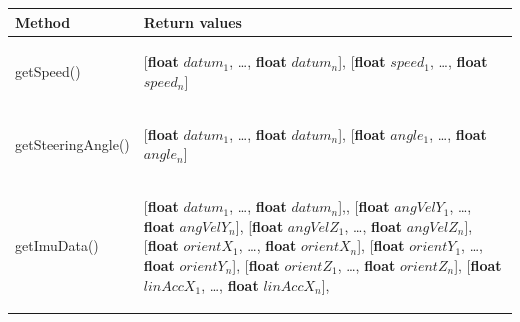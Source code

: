 \documentclass[]{scrreprt}
\begin{document}
	\begin{table}[H]
		\centering
		\begin{tabular}{|l|l|}
			\hline 
			Method & Return values \\ 
			\hline \hline
			\begin{pbox}{6.0cm}{\vspace{.2\baselineskip}
					getSpeed()
					\vspace{.3\baselineskip}} \end{pbox}&\begin{pbox}{6.0cm}{\vspace{.2\baselineskip}
					[\textbf{float} $datum_1$, \dots, \textbf{float} $datum_n$], [\textbf{float} $speed_1$, \dots, \textbf{float} $speed_n$]
					\vspace{.3\baselineskip}} \end{pbox}\\ 
			\hline 
			\begin{pbox}{6.0cm}{\vspace{.2\baselineskip}
					getSteeringAngle()
					\vspace{.3\baselineskip}} \end{pbox}&\begin{pbox}{6.0cm}{\vspace{.2\baselineskip}
					[\textbf{float} $datum_1$, \dots, \textbf{float} $datum_n$], [\textbf{float} $angle_1$, \dots, \textbf{float} $angle_n$]
						\vspace{.3\baselineskip}} \end{pbox}\\ 
			\hline 
			\begin{pbox}{6.0cm}{\vspace{.2\baselineskip}
					getImuData()
					\vspace{.3\baselineskip}}
			\end{pbox}&
			\begin{pbox}{6.7cm}{\vspace{.2\baselineskip}
					[\textbf{float} $datum_1$, \dots, \textbf{float} $datum_n$],\newline
					[\textbf{float} $angVelX_1$, \dots, \textbf{float} $angVelX_n$],
					[\textbf{float} $angVelY_1$, \dots, \textbf{float} $angVelY_n$],
					[\textbf{float} $angVelZ_1$, \dots, \textbf{float} $angVelZ_n$],
					[\textbf{float} $orientX_1$, \dots, \textbf{float} $orientX_n$],
					[\textbf{float} $orientY_1$, \dots, \textbf{float} $orientY_n$],
					[\textbf{float} $orientZ_1$, \dots, \textbf{float} $orientZ_n$],
					[\textbf{float} $linAccX_1$, \dots, \textbf{float} $linAccX_n$],
}
\end{pbox}
\end{tabular}
\end{table}
\end{document}
